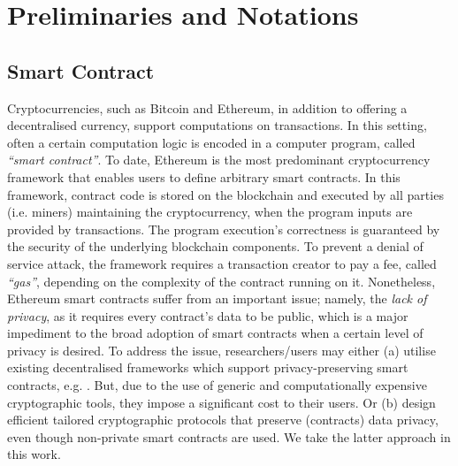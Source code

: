 


\section{Preliminaries and Notations} \label{preliminaries}




\subsection{Smart Contract} Cryptocurrencies, such as Bitcoin and Ethereum, in addition to offering a decentralised currency,  support  computations on  transactions. In this setting, often a certain computation logic is encoded in a computer program, called \emph{``smart contract''}. To date, Ethereum is the most predominant cryptocurrency framework that enables users to define arbitrary smart contracts. In this framework,  contract code is stored on the blockchain and  executed by all parties (i.e. miners) maintaining the cryptocurrency,  when the program inputs are provided by transactions. The program execution's  correctness  is  guaranteed by the security of the underlying blockchain components. To prevent  a denial of service attack, the framework requires a transaction creator to pay a  fee, called \emph{``gas''}, depending on the complexity of the contract running on  it.  Nonetheless,  Ethereum smart contracts suffer from an important   issue; namely, the \emph{lack of privacy}, as it requires  every contract's data to be public, which is a major impediment  to  the broad adoption of  smart contracts when a certain level of privacy is desired. To address the issue, researchers/users may either (a)  utilise existing decentralised frameworks  which support privacy-preserving smart contracts, e.g. \cite{KosbaMSWP16}. But, due to the use of generic and computationally expensive cryptographic tools,  they impose a significant cost to their users. Or (b)  design  efficient tailored cryptographic protocols  that preserve (contracts) data privacy, even though non-private smart contracts are used. We take the latter approach in this work. 




